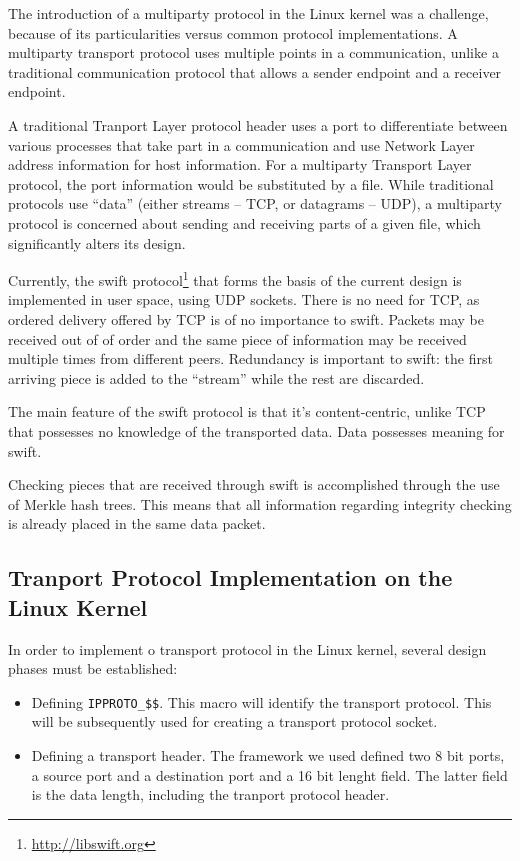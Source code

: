 The introduction of a multiparty protocol in the Linux kernel was a challenge,
because of its particularities versus common protocol implementations. A
multiparty transport protocol uses multiple points in a communication, unlike
a traditional communication protocol that allows a sender endpoint and a
receiver endpoint.

A traditional Tranport Layer protocol header uses a port to differentiate
between various processes that take part in a communication and use Network
Layer address information for host information. For a multiparty Transport
Layer protocol, the port information would be substituted by a file. While
traditional protocols use ``data'' (either streams -- TCP, or datagrams --
UDP), a multiparty protocol is concerned about sending and receiving parts of
a given file, which significantly alters its design.

Currently, the swift protocol\footnote{\url{http://libswift.org}} that forms the
basis of the current design is implemented in user space, using UDP sockets.
There is no need for TCP, as ordered delivery offered by TCP is of no
importance to swift.  Packets may be received out of of order and the same
piece of information may be received multiple times from different peers.
Redundancy is important to swift: the first arriving piece is added to the
``stream'' while the rest are discarded.

The main feature of the swift protocol is that it's content-centric, unlike
TCP that possesses no knowledge of the transported data. Data possesses
meaning for swift.

Checking pieces that are received through swift is accomplished through the
use of Merkle hash trees. This means that all information
regarding integrity checking is already placed in the same data packet.


\subsection{Tranport Protocol Implementation on the Linux Kernel}

In order to implement o transport protocol in the Linux kernel, several design
phases must be established:

\begin{itemize}
  \item Defining \texttt{IPPROTO\_\$\$}. This macro will identify the
  transport protocol. This will be subsequently used for creating a transport
  protocol socket.
  \item Defining a transport header. The framework we used defined two 8 bit
  ports, a source port and a destination port and a 16 bit lenght field. The
  latter field is the data length, including the tranport protocol header.
\end{itemize}

